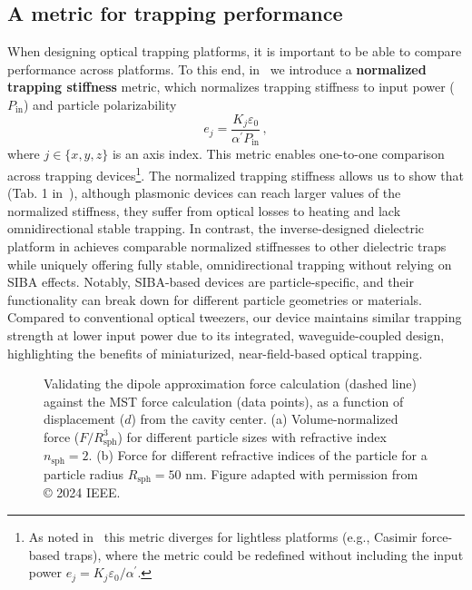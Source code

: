 \subsection*{A metric for trapping performance~\cite{ownpub1}}

When designing optical trapping platforms, it is important to be able to compare performance across platforms. To this end, in~\cite{ownpub3} we introduce a \textbf{normalized
trapping stiffness} metric, which normalizes trapping stiffness to input power ($P_\text{in}$) and particle  polarizability
\begin{equation}
 e_j=\frac{K_j \varepsilon_0}{\alpha^\prime P_{\text{in}}}\,,
\end{equation}
where $j \in \lbrace x,y,z \rbrace$ is an axis index. This metric enables one-to-one comparison across trapping devices\footnote{As noted in~\cite{ownpub3} this metric diverges for lightless platforms (e.g., Casimir force-based traps), where the metric could be redefined
without including the input power $e_j=K_j \varepsilon_0/\alpha^\prime$.}. The normalized trapping stiffness allows us to show that (Tab. 1 in~\cite{ownpub3}), although plasmonic devices can reach larger values of the normalized 
stiffness, they suffer from optical losses to heating and lack omnidirectional stable trapping. In contrast, the inverse-designed dielectric platform in 
 achieves comparable normalized stiffnesses to other dielectric traps while uniquely offering fully stable, omnidirectional trapping
 without relying on SIBA effects. Notably, SIBA-based devices are particle-specific, and their functionality can break down
 for different particle geometries or materials. Compared to conventional optical tweezers, our device maintains similar trapping
 strength at lower input power due to its integrated, waveguide-coupled design, highlighting the benefits of miniaturized,
 near-field-based optical trapping.

 \begin{figure}[tb]
    \centering
    \caption{Validating the dipole approximation force calculation (dashed line) against the MST force calculation (data points), as a function of displacement ($d$) from the cavity center.
    (a) Volume-normalized force ($F/R^3_\text{sph}$) for different particle sizes with refractive index $n_\text{sph}=2$. (b) Force for different refractive indices of the particle for a particle radius $R_\text{sph}=50$ nm. Figure adapted with permission from~\cite{ownpub3} © 2024 IEEE.}
    \label{fig:SPIE}
\end{figure}

